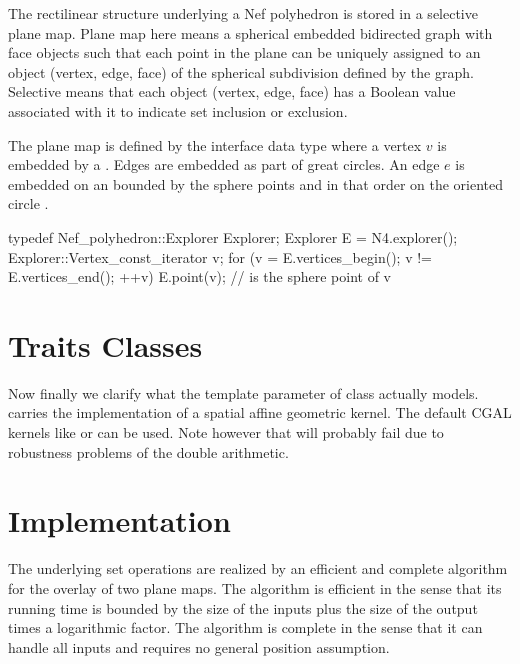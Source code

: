 The rectilinear structure underlying a Nef polyhedron is stored in a
selective plane map. Plane map here means a spherical embedded
bidirected graph with face objects such that each point in the plane
can be uniquely assigned to an object (vertex, edge, face) of the
spherical subdivision defined by the graph. Selective means that each
object (vertex, edge, face) has a Boolean value associated with it to
indicate set inclusion or exclusion.

The plane map is defined by the interface data type
 where a vertex $v$ is embedded by
a  . Edges are embedded as part of
great circles. An edge $e$ is embedded on  an bounded
by the sphere points  and 
in that order on the oriented circle .

\begin{ccExampleCode}
typedef Nef_polyhedron::Explorer Explorer;
Explorer E = N4.explorer();
Explorer::Vertex_const_iterator v;
for (v = E.vertices_begin(); v != E.vertices_end(); ++v)
  E.point(v); // is the sphere point of v
\end{ccExampleCode}


\section{Traits Classes}

Now finally we clarify what the template parameter of class
 actually models.  carries the
implementation of a spatial affine geometric kernel. The default CGAL
kernels like  or  can be used.
Note however that  will probably fail due to
robustness problems of the double arithmetic.

\section{Implementation}

The underlying set operations are realized by an efficient and
complete algorithm for the overlay of two plane maps. The algorithm is
efficient in the sense that its running time is bounded by the size of
the inputs plus the size of the output times a logarithmic factor. The
algorithm is complete in the sense that it can handle all inputs and
requires no general position assumption.



